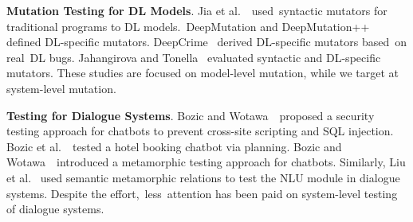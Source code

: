\textbf{Mutation Testing for DL Models}. Jia et al.~\cite{JiaMutation}~used~syntactic mutators for traditional programs to DL models.~DeepMutation \cite{DeepMutation} and DeepMutation++~\cite{DeepMutation++} defined DL-specific mutators. DeepCrime~\cite{DeepCrime} derived DL-specific  mutators based~on real~DL bugs. 
Jahangirova and Tonella~\cite{mutation_evaluation} evaluated syntactic and DL-specific mutators. These studies are focused on model-level mutation, while we target at system-level mutation.

\textbf{Testing for Dialogue Systems}. Bozic and Wotawa~\cite{Bozic2018}~proposed a security testing approach for chatbots to prevent cross-site scripting and SQL injection. Bozic et al.~\cite{Bozic2019a}~tested a hotel booking chatbot via planning. Bozic and Wotawa~\cite{Bozic2019b}~introduced a metamorphic testing approach for chatbots. Similarly, Liu et al.~\cite{liu2021dialtest} used semantic metamorphic relations to test the NLU module in dialogue systems. Despite the effort,~less~attention has been paid on system-level testing of dialogue systems.

